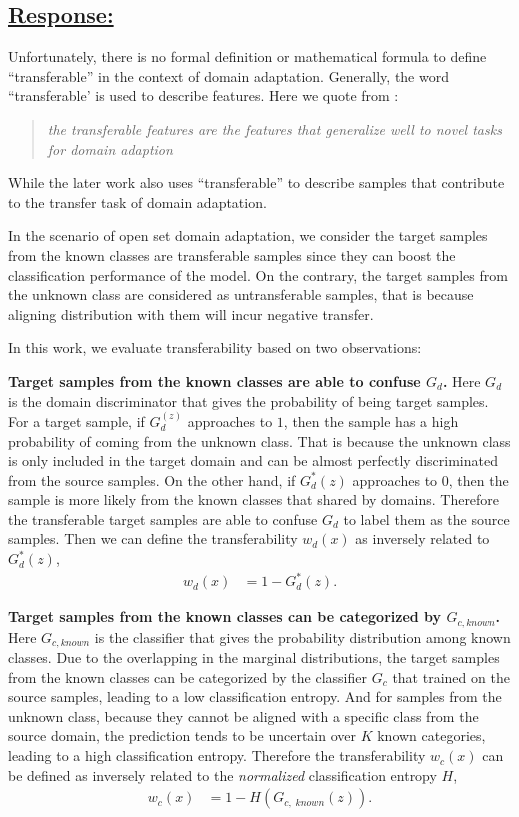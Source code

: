 \subsection*{\underline{\textbf{Response:}}}

Unfortunately, there is no formal definition or mathematical formula to define ``transferable'' in the context of domain adaptation.
Generally, the word ``transferable' is used to describe features.
Here we quote from \cite{DeepAdaptationNetworks}:
\begin{quote}
    \textit{the transferable features are the features that generalize well to novel tasks for domain adaption}
\end{quote}
While the later work \cite{TransferableAttentionDA} also uses ``transferable'' to describe samples that contribute to the transfer task of domain adaptation.

In the scenario of open set domain adaptation, we consider the target samples from the known classes are transferable samples since they can boost the classification performance of the model.
On the contrary, the target samples from the unknown class are considered as untransferable samples, that is because aligning distribution with them will incur negative transfer.

In this work, we evaluate transferability based on two observations:

\textbf{Target samples from the known classes are able to confuse $G_d$.}
Here $G_d$ is the domain discriminator that gives the probability of being target samples.
For a target sample, if $G_d^(z)$ approaches to $1$, then the sample has a high probability of coming from the unknown class.
That is because the unknown class is only included in the target domain and can be almost perfectly discriminated from the source samples.
On the other hand, if $G_d^*(z)$ approaches to $0$, then the sample is more likely from the known classes that shared by domains.
Therefore the transferable target samples are able to confuse $G_d$ to label them as the source samples.
Then we can define the transferability $w_d(x)$ as inversely related to $G_d^*(z)$,
\begin{align}
    w_d(x) &= 1-G_d^*(z). \label{eq: domain transferability}
\end{align}

\textbf{Target samples from the known classes can be categorized by $G_{c, known}$.}
Here $G_{c, known}$ is the classifier that gives the probability distribution among known classes.
Due to the overlapping in the marginal distributions, the target samples from the known classes can be categorized by the classifier $G_c$ that trained on the source samples, leading to a low classification entropy.
And for samples from the unknown class, because they cannot be aligned with a specific class from the source domain, the prediction tends to be uncertain over $K$ known categories, leading to a high classification entropy.
Therefore the transferability $w_c(x)$ can be defined as inversely related to the \textit{normalized} classification entropy $H$,
\begin{align}
    w_c(x) &=1-H(G_{c,\; known}(z)). \label{eq: class transferability}
\end{align}


